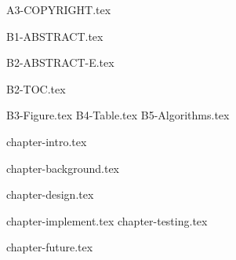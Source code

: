 \documentclass[12pt,openany,a4paper,fancyhdr,twoside]{ctexbook}
\newcommand{\clearPaperPage}{\clearpage}
\newcommand{\banxiaosi}{\fontsize{13pt}{19.5pt}\selectfont}    %
\newcommand{\xiaosi}{\fontsize{12pt}{18pt}\selectfont}            %
\begin{document}

\clearPaperPage



\clearPaperPage
 {A3-COPYRIGHT.tex}

\clearPaperPage




\clearPaperPage
{}
\pagestyle{plain}



 {B1-ABSTRACT.tex}

\clearPaperPage
 {B2-ABSTRACT-E.tex}
\clearPaperPage



 {B2-TOC.tex}

\clearPaperPage

 {B3-Figure.tex}
\clearPaperPage
 {B4-Table.tex}
\clearPaperPage
 {B5-Algorithms.tex}







\clearPaperPage
{}
\pagestyle{fancy}
\fancyhead[RE,LO]{ \leftmark}





\setlength{\baselineskip}{25pt}  %





\raggedbottom
\xiaosi
\clearPaperPage


 {chapter-intro.tex}
\clearPaperPage


 {chapter-background.tex}
\clearPaperPage



\clearPaperPage
 {chapter-design.tex}

\cleardoublepage
 {chapter-implement.tex}
\clearPaperPage
 {chapter-testing.tex}
\clearPaperPage


\clearPaperPage

 {chapter-future.tex}
\end{document}
